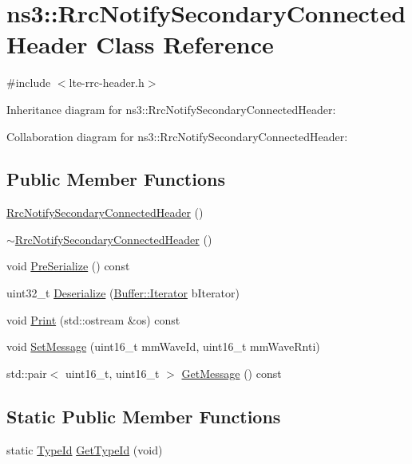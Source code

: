 \hypertarget{classns3_1_1RrcNotifySecondaryConnectedHeader}{}\section{ns3\+:\+:Rrc\+Notify\+Secondary\+Connected\+Header Class Reference}
\label{classns3_1_1RrcNotifySecondaryConnectedHeader}


{\ttfamily \#include $<$lte-\/rrc-\/header.\+h$>$}



Inheritance diagram for ns3\+:\+:Rrc\+Notify\+Secondary\+Connected\+Header\+:


Collaboration diagram for ns3\+:\+:Rrc\+Notify\+Secondary\+Connected\+Header\+:
\subsection*{Public Member Functions}
\begin{DoxyCompactItemize}
\item 
\hyperlink{classns3_1_1RrcNotifySecondaryConnectedHeader_a1e0b41dc605e9e56a6652702f70420f1}{Rrc\+Notify\+Secondary\+Connected\+Header} ()
\item 
\hyperlink{classns3_1_1RrcNotifySecondaryConnectedHeader_aa5c9f1c8682958cb26a8ef0c36ab64ca}{$\sim$\+Rrc\+Notify\+Secondary\+Connected\+Header} ()
\item 
void \hyperlink{classns3_1_1RrcNotifySecondaryConnectedHeader_aae3574a8bdbcc62bef8f6b989a83f1aa}{Pre\+Serialize} () const 
\item 
uint32\+\_\+t \hyperlink{classns3_1_1RrcNotifySecondaryConnectedHeader_ae943b583ad31a87771f9b3e2f9309c80}{Deserialize} (\hyperlink{classns3_1_1Buffer_1_1Iterator}{Buffer\+::\+Iterator} b\+Iterator)
\item 
void \hyperlink{classns3_1_1RrcNotifySecondaryConnectedHeader_a585f6683ef70593792c858554fae974c}{Print} (std\+::ostream \&os) const 
\item 
void \hyperlink{classns3_1_1RrcNotifySecondaryConnectedHeader_a7c53d5a67ad93825a6012360194dfe6a}{Set\+Message} (uint16\+\_\+t mm\+Wave\+Id, uint16\+\_\+t mm\+Wave\+Rnti)
\item 
std\+::pair$<$ uint16\+\_\+t, uint16\+\_\+t $>$ \hyperlink{classns3_1_1RrcNotifySecondaryConnectedHeader_a2d3ad1173220cde9468926b88baf844e}{Get\+Message} () const 
\end{DoxyCompactItemize}
\subsection*{Static Public Member Functions}
\begin{DoxyCompactItemize}
\item 
static \hyperlink{classns3_1_1TypeId}{Type\+Id} \hyperlink{classns3_1_1RrcNotifySecondaryConnectedHeader_a056377224934f83c888fc96162dd33a9}{Get\+Type\+Id} (void)
\end{DoxyCompactItemize}
